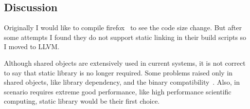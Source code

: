 \subsection{Discussion}
Originally I would like to compile firefox~\cite{firefox} to see the code size
change. But after some attempts I found they do not support static linking in their
build scripts so I moved to LLVM.

Although shared objects are extensively used in current systems, it is not
correct to say that static library is no longer required. Some problems 
raised only in shared objects, like library dependency, and the binary 
compatibility~\cite{dllhell}. Also, in scenario requires extreme good performance,
like high performance scientific computing, static library would be their
first choice.
